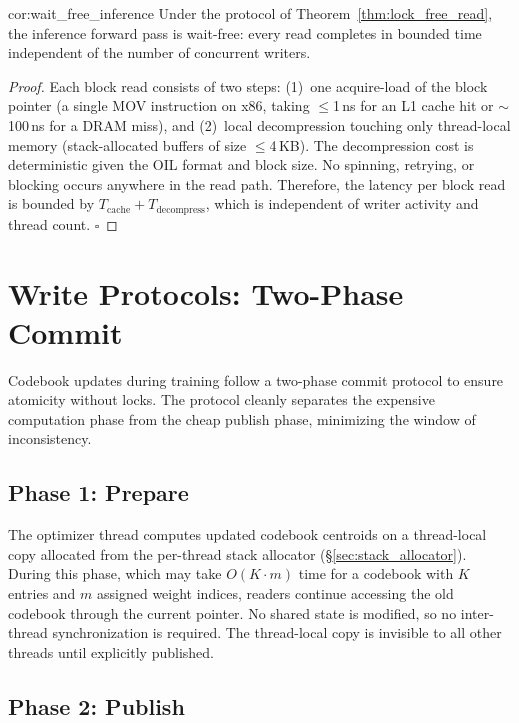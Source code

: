\begin{mycor}{cor:wait_free_inference}
Under the protocol of Theorem~\ref{thm:lock_free_read}, the inference forward pass is wait-free: every read completes in bounded time independent of the number of concurrent writers.
\end{mycor}

\begin{proof}
Each block read consists of two steps: (1)~one acquire-load of the block pointer (a single MOV instruction on x86, taking $\leq$1\,ns for an L1 cache hit or $\sim$100\,ns for a DRAM miss), and (2)~local decompression touching only thread-local memory (stack-allocated buffers of size $\leq$4\,KB). The decompression cost is deterministic given the OIL format and block size. No spinning, retrying, or blocking occurs anywhere in the read path. Therefore, the latency per block read is bounded by $T_{\text{cache}} + T_{\text{decompress}}$, which is independent of writer activity and thread count. $\square$
\end{proof}

\section{Write Protocols: Two-Phase Commit}
\label{sec:write_protocols}

Codebook updates during training follow a two-phase commit protocol to ensure atomicity without locks. The protocol cleanly separates the expensive computation phase from the cheap publish phase, minimizing the window of inconsistency.

\subsection{Phase 1: Prepare}

The optimizer thread computes updated codebook centroids on a thread-local copy allocated from the per-thread stack allocator (\S\ref{sec:stack_allocator}). During this phase, which may take $O(K \cdot m)$ time for a codebook with $K$ entries and $m$ assigned weight indices, readers continue accessing the old codebook through the current pointer. No shared state is modified, so no inter-thread synchronization is required. The thread-local copy is invisible to all other threads until explicitly published.

\subsection{Phase 2: Publish}

